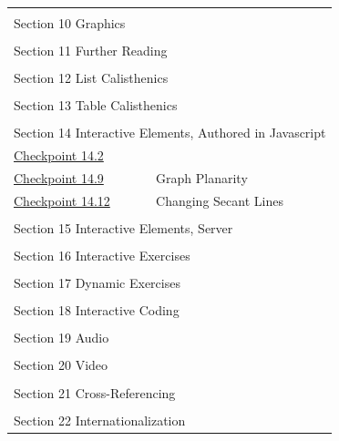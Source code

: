 \documentclass{amsart}
\theoremstyle{plain}%
\theoremstyle{definition}%
\theoremstyle{remark}%
\numberwithin{equation}{section}
\begin{document}
\begin{longtable}[l]{ll}
\multicolumn{2}{l}{\null}\\[1.5ex] \multicolumn{2}{l}{\large Section 10 Graphics}\\[0.5ex]
\multicolumn{2}{l}{\null}\\[1.5ex] \multicolumn{2}{l}{\large Section 11 Further Reading}\\[0.5ex]
\multicolumn{2}{l}{\null}\\[1.5ex] \multicolumn{2}{l}{\large Section 12 List Calisthenics}\\[0.5ex]
\multicolumn{2}{l}{\null}\\[1.5ex] \multicolumn{2}{l}{\large Section 13 Table Calisthenics}\\[0.5ex]
\multicolumn{2}{l}{\null}\\[1.5ex] \multicolumn{2}{l}{\large Section 14 Interactive Elements, Authored in Javascript}\\[0.5ex]
\hyperref[interactive-html5-canvas-5]{Checkpoint 14.2}& \\
\hyperref[section-interactive-authored-8-10]{Checkpoint 14.9}& Graph Planarity\\
\hyperref[svg-interactives-5]{Checkpoint 14.12}& Changing Secant Lines\\
\multicolumn{2}{l}{\null}\\[1.5ex] \multicolumn{2}{l}{\large Section 15 Interactive Elements, Server}\\[0.5ex]
\multicolumn{2}{l}{\null}\\[1.5ex] \multicolumn{2}{l}{\large Section 16 Interactive Exercises}\\[0.5ex]
\multicolumn{2}{l}{\null}\\[1.5ex] \multicolumn{2}{l}{\large Section 17 Dynamic Exercises}\\[0.5ex]
\multicolumn{2}{l}{\null}\\[1.5ex] \multicolumn{2}{l}{\large Section 18 Interactive Coding}\\[0.5ex]
\multicolumn{2}{l}{\null}\\[1.5ex] \multicolumn{2}{l}{\large Section 19 Audio}\\[0.5ex]
\multicolumn{2}{l}{\null}\\[1.5ex] \multicolumn{2}{l}{\large Section 20 Video}\\[0.5ex]
\multicolumn{2}{l}{\null}\\[1.5ex] \multicolumn{2}{l}{\large Section 21 Cross-Referencing}\\[0.5ex]
\multicolumn{2}{l}{\null}\\[1.5ex] \multicolumn{2}{l}{\large Section 22 Internationalization}\\[0.5ex]

\end{longtable}
\end{document}
